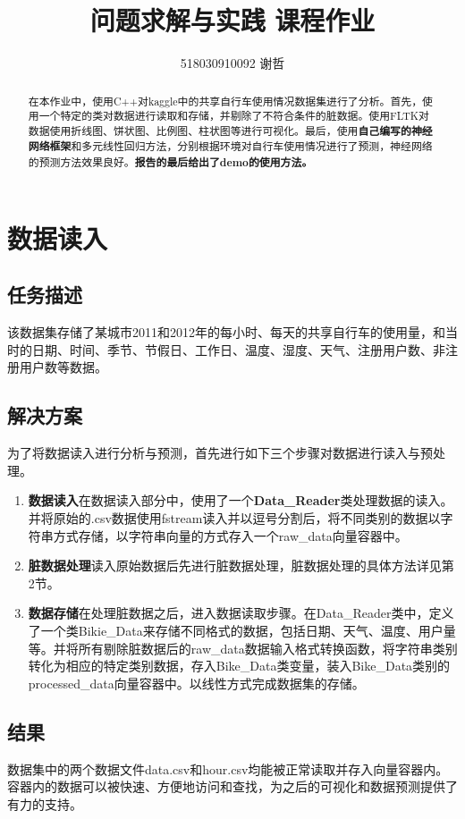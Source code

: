 \documentclass[CJK]{ctexart}
\begin{document}
\title{\textbf{问题求解与实践 \quad 课程作业}}
\author{518030910092 谢哲}
\date{}
\maketitle

\begin{abstract}
    在本作业中，使用C++对kaggle中的共享自行车使用情况数据集进行了分析。首先，使用一个特定的类对数据进行读取和存储，并剔除了不符合条件的脏数据。使用FLTK对数据使用折线图、饼状图、比例图、柱状图等进行可视化。最后，使用\textbf{自己编写的神经网络框架}和多元线性回归方法，分别根据环境对自行车使用情况进行了预测，神经网络的预测方法效果良好。\textbf{报告的最后给出了demo的使用方法。}
\end{abstract}
\section{数据读入}
\subsection{任务描述}
    该数据集存储了某城市2011和2012年的每小时、每天的共享自行车的使用量，和当时的日期、时间、季节、节假日、工作日、温度、湿度、天气、注册用户数、非注册用户数等数据。
\subsection{解决方案}
为了将数据读入进行分析与预测，首先进行如下三个步骤对数据进行读入与预处理。
    \begin{enumerate}[(1)]
        \item \textbf{数据读入}\quad 在数据读入部分中，使用了一个\textbf{Data\_Reader}类处理数据的读入。并将原始的.csv数据使用fstream读入并以逗号分割后，将不同类别的数据以字符串方式存储，以字符串向量的方式存入一个raw\_data向量容器中。
        \item \textbf{脏数据处理}\quad 读入原始数据后先进行脏数据处理，脏数据处理的具体方法详见第2节。
        \item \textbf{数据存储}\quad 在处理脏数据之后，进入数据读取步骤。在Data\_Reader类中，定义了一个类Bikie\_Data来存储不同格式的数据，包括日期、天气、温度、用户量等。并将所有剔除脏数据后的raw\_data数据输入格式转换函数，将字符串类别转化为相应的特定类别数据，存入Bike\_Data类变量，装入Bike\_Data类别的processed\_data向量容器中。以线性方式完成数据集的存储。
    \end{enumerate} 
\subsection{结果}
数据集中的两个数据文件data.csv和hour.csv均能被正常读取并存入向量容器内。容器内的数据可以被快速、方便地访问和查找，为之后的可视化和数据预测提供了有力的支持。
\end{document}
